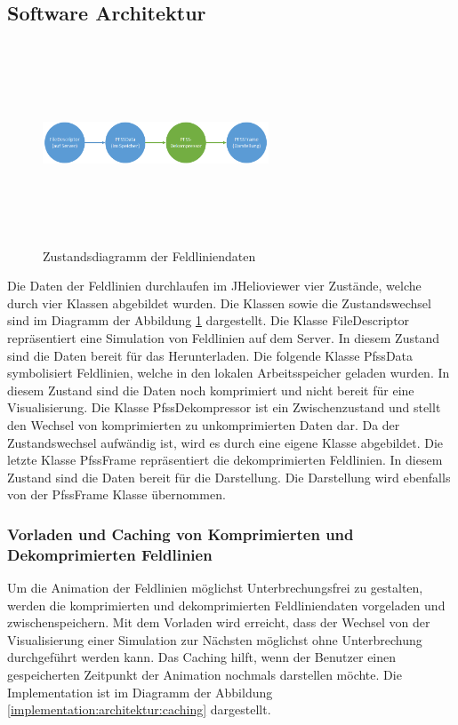 \subsection{Software Architektur}
\begin{figure}[!htbp]
	\center
	\includegraphics[width=0.6\textwidth,height=6cm,keepaspectratio]{./pictures/implementation/dataflow.png}
	\caption{Zustandsdiagramm der Feldliniendaten}
	\label{implementation:architektur:datenfluss}
\end{figure}
Die Daten der Feldlinien durchlaufen im JHelioviewer vier Zustände, welche durch vier Klassen abgebildet wurden. Die Klassen sowie die Zustandswechsel sind im Diagramm der Abbildung \ref{implementation:architektur:datenfluss} dargestellt. Die Klasse FileDescriptor repräsentiert eine Simulation von Feldlinien auf dem Server. In diesem Zustand sind die Daten bereit für das Herunterladen. Die folgende Klasse PfssData symbolisiert Feldlinien, welche in den lokalen Arbeitsspeicher geladen wurden. In diesem Zustand sind die Daten noch komprimiert und nicht bereit für eine Visualisierung. Die Klasse PfssDekompressor ist ein Zwischenzustand und stellt den Wechsel von komprimierten zu unkomprimierten Daten dar. Da der Zustandswechsel aufwändig ist, wird es durch eine eigene Klasse abgebildet. Die letzte Klasse PfssFrame repräsentiert die dekomprimierten Feldlinien. In diesem Zustand sind die Daten bereit für die Darstellung. Die Darstellung wird ebenfalls von der PfssFrame Klasse übernommen.

\subsubsection{Vorladen und Caching von Komprimierten und Dekomprimierten Feldlinien}
Um die Animation der Feldlinien möglichst Unterbrechungsfrei zu gestalten, werden die komprimierten und dekomprimierten Feldliniendaten vorgeladen und zwischenspeichern. Mit dem Vorladen wird erreicht, dass der Wechsel von der Visualisierung einer Simulation zur Nächsten möglichst ohne Unterbrechung durchgeführt werden kann. Das Caching hilft, wenn der Benutzer einen gespeicherten Zeitpunkt der Animation nochmals darstellen möchte. Die Implementation ist im Diagramm der Abbildung \ref{implementation:architektur:caching} dargestellt.

